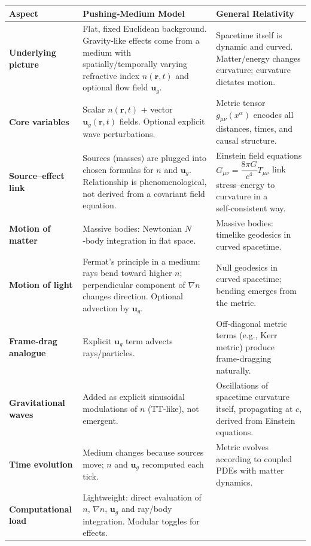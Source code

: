 \documentclass{article}
\begin{document}
\begin{table}[h!]
\centering
\begin{tabularx}{\textwidth}{|p{3cm}|X|X|}
\hline
	\textbf{Aspect} & \textbf{Pushing‑Medium Model} & \textbf{General Relativity} \\
\hline
	\textbf{Underlying picture} &
Flat, fixed Euclidean background. Gravity‑like effects come from a medium with spatially/temporally varying refractive index $n(\mathbf{r},t)$ and optional flow field $\mathbf{u}_g$. &
Spacetime itself is dynamic and curved. Matter/energy changes curvature; curvature dictates motion. \\
\hline
	\textbf{Core variables} &
Scalar $n(\mathbf{r},t)$ + vector $\mathbf{u}_g(\mathbf{r},t)$ fields. Optional explicit wave perturbations. &
Metric tensor $g_{\mu\nu}(x^\alpha)$ encodes all distances, times, and causal structure. \\
\hline
	\textbf{Source--effect link} &
Sources (masses) are plugged into chosen formulas for $n$ and $\mathbf{u}_g$. Relationship is phenomenological, not derived from a covariant field equation. &
Einstein field equations $G_{\mu\nu} = \dfrac{8\pi G}{c^4}T_{\mu\nu}$ link stress--energy to curvature in a self‑consistent way. \\
\hline
	\textbf{Motion of matter} &
Massive bodies: Newtonian $N$‑body integration in flat space. &
Massive bodies: timelike geodesics in curved spacetime. \\
\hline
	\textbf{Motion of light} &
Fermat’s principle in a medium: rays bend toward higher $n$; perpendicular component of $\nabla n$ changes direction. Optional advection by $\mathbf{u}_g$. &
Null geodesics in curved spacetime; bending emerges from the metric. \\
\hline
	\textbf{Frame‑drag analogue} &
Explicit $\mathbf{u}_g$ term advects rays/particles. &
Off‑diagonal metric terms (e.g., Kerr metric) produce frame‑dragging naturally. \\
\hline
	\textbf{Gravitational waves} &
Added as explicit sinusoidal modulations of $n$ (TT‑like), not emergent. &
Oscillations of spacetime curvature itself, propagating at $c$, derived from Einstein equations. \\
\hline
	\textbf{Time evolution} &
Medium changes because sources move; $n$ and $\mathbf{u}_g$ recomputed each tick. &
Metric evolves according to coupled PDEs with matter dynamics. \\
\hline
	\textbf{Computational load} &
Lightweight: direct evaluation of $n$, $\nabla n$, $\mathbf{u}_g$ and ray/body integration. Modular toggles for effects. &

\end{tabularx}
\end{table}
\end{document}
